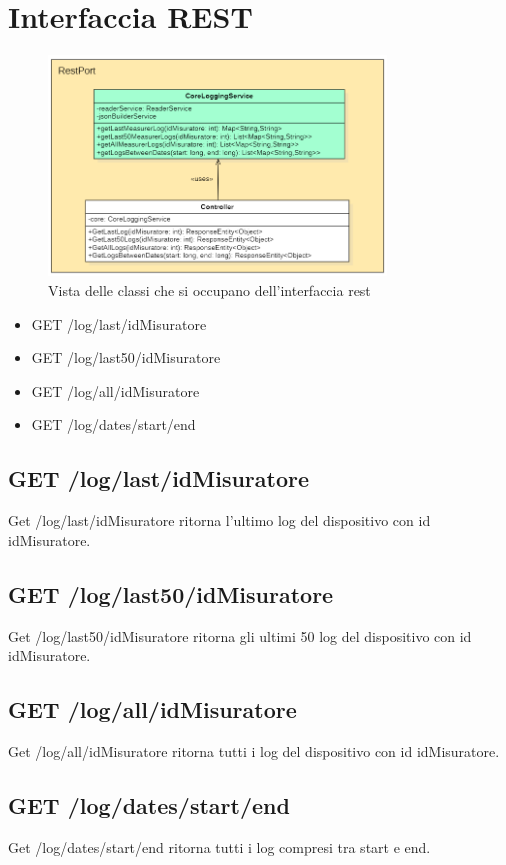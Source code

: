 \section{Interfaccia REST}

\begin{figure}[ht]
    \centering
    \includegraphics[width=0.8\textwidth]{img/classi_logging_port_rest.png}
    \caption{Vista delle classi che si occupano dell'interfaccia rest}
    \label{fig:rest_logging}
\end{figure}

\begin{itemize}
    \item GET /log/last/{idMisuratore}
    \item GET /log/last50/{idMisuratore}
    \item GET /log/all/{idMisuratore}
    \item GET /log/dates/{start}/{end}
\end{itemize}

\subsection{GET /log/last/{idMisuratore}}
Get /log/last/{idMisuratore} ritorna l'ultimo log del dispositivo con id idMisuratore.

\subsection{GET /log/last50/{idMisuratore}}
Get /log/last50/{idMisuratore} ritorna gli ultimi 50 log del dispositivo con id idMisuratore.

\subsection{GET /log/all/{idMisuratore}}
Get /log/all/{idMisuratore} ritorna tutti i log del dispositivo con id idMisuratore.

\subsection{GET /log/dates/{start}/{end}}
Get /log/dates/{start}/{end} ritorna tutti i log compresi tra start e end.


